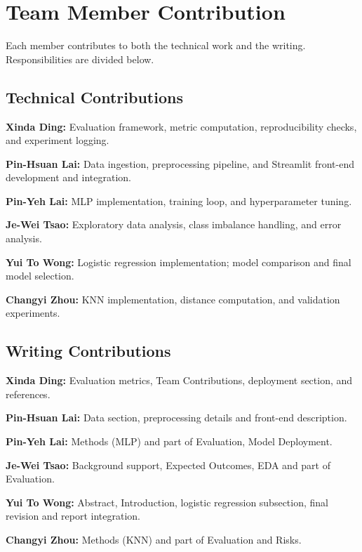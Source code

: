 \section{Team Member Contribution}

Each member contributes to both the technical work and the writing. Responsibilities are divided below.

\subsection{Technical Contributions}

\textbf{Xinda Ding:} Evaluation framework, metric computation, reproducibility checks, and experiment logging.

\textbf{Pin-Hsuan Lai:} Data ingestion, preprocessing pipeline, and Streamlit front-end development and integration.

\textbf{Pin-Yeh Lai:} MLP implementation, training loop, and hyperparameter tuning.

\textbf{Je-Wei Tsao:} Exploratory data analysis, class imbalance handling, and error analysis.

\textbf{Yui To Wong:} Logistic regression implementation; model comparison and final model selection.

\textbf{Changyi Zhou:} KNN implementation, distance computation, and validation experiments.

\subsection{Writing Contributions}

\textbf{Xinda Ding:} Evaluation metrics, Team Contributions, deployment section, and references.

\textbf{Pin-Hsuan Lai:} Data section, preprocessing details and front-end description.

\textbf{Pin-Yeh Lai:} Methods (MLP) and part of Evaluation, Model Deployment.

\textbf{Je-Wei Tsao:} Background support, Expected Outcomes, EDA  and part of Evaluation.

\textbf{Yui To Wong:} Abstract, Introduction, logistic regression subsection, final revision and report integration.

\textbf{Changyi Zhou:} Methods (KNN) and part of Evaluation and Risks.